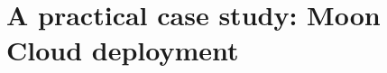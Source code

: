 \documentclass[../main.tex]{subfiles}
\begin{document}
\chapter{A practical case study: Moon Cloud deployment}
\end{document}
